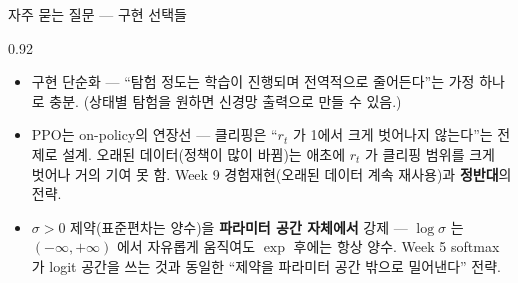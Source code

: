 \begin{frame}{자주 묻는 질문 — 구현 선택들}
\begin{center}\begin{varwidth}{0.92\textwidth}
  \small
  \begin{itemize}
    \item {}
      구현 단순화 — ``탐험 정도는 학습이 진행되며 전역적으로
      줄어든다''는 가정 하나로 충분. (상태별 탐험을 원하면 신경망
      출력으로 만들 수 있음.)
    \item {}
      PPO는 on-policy의 연장선 — 클리핑은 ``$r_t$ 가 1에서 크게
      벗어나지 않는다''는 전제로 설계. 오래된 데이터(정책이 많이
      바뀜)는 애초에 $r_t$ 가 클리핑 범위를 크게 벗어나 거의
      기여 못 함. Week 9 경험재현(오래된 데이터 계속 재사용)과
      \textbf{정반대}의 전략.
    \item {}
      $\sigma>0$ 제약(표준편차는 양수)을 \textbf{파라미터 공간
      자체에서} 강제 — $\log\sigma$ 는 $(-\infty,+\infty)$
      에서 자유롭게 움직여도 $\exp$ 후에는 항상 양수.
      Week 5 softmax가 logit 공간을 쓰는 것과 동일한 ``제약을
      파라미터 공간 밖으로 밀어낸다'' 전략.
  \end{itemize}
\end{varwidth}\end{center}
\end{frame}
